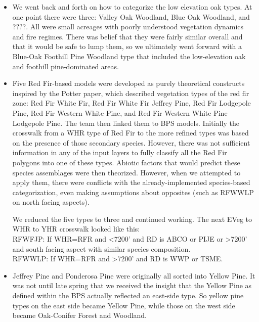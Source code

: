 \begin{itemize}
For example, here is the rule for how to derive YHR type PPBO from WHR:\\
``If \textgreater3000 feet in elevation  and the regional dominance is black oak or ponderosa pine then SMCX (S facing aspects) else SMCM (N facing aspects), else \textless3000 feet in elevation  and the regional dominance is black oak or ponderosa pine then PPBO.''

Note that this is an ecologically based theoretically model, but not one that is designed to be all inclusive and mutually exclusive within our vegetation cover framework.
\item We went back and forth on how to categorize the low elevation oak types. At one point there were three: Valley Oak Woodland, Blue Oak Woodland, and ????. All were small acreages with poorly understood vegetation dynamics and fire regimes. There was belief that they were fairly similar overall and that it would be safe to lump them, so we ultimately went forward with a Blue-Oak Foothill Pine Woodland type that included the low-elevation oak and foothill pine-dominated areas.

\item Five Red Fir-based models were developed as purely theoretical constructs inspired by the Potter paper, which described vegetation types of the red fir zone: Red Fir White Fir, Red Fir White Fir Jeffrey Pine, Red Fir Lodgepole Pine, Red Fir Western White Pine, and Red Fir Western White Pine Lodgepole Pine. The team then linked them to BPS models. Initially the crosswalk from a WHR type of Red Fir to the more refined types was based on the presence of those secondary species. However, there was not sufficient information in any of the input layers to fully classify all the Red Fir polygons into one of these types. Abiotic factors that would predict these species assemblages were then theorized. However, when we attempted to apply them, there were conflicts with the already-implemented species-based categorization, even making assumptions about opposites (such as RFWWLP on north facing aspects). 

We reduced the five types to three and continued working. The next EVeg to WHR to YHR crosswalk looked like this:\\
RFWFJP: If WHR=RFR and \textless7200' and RD is ABCO or PIJE  or \textgreater7200' and south facing aspect with similar species composition.\\
RFWWLP: If WHR=RFR and \textgreater7200' and RD is WWP or TSME.

\item Jeffrey Pine and Ponderosa Pine were originally all sorted into Yellow Pine. It was not until late spring that we received the insight that the Yellow Pine as defined within the BPS actually reflected an east-side type. So yellow pine types on the east side became Yellow Pine, while those on the west side became Oak-Conifer Forest and Woodland.


\end{itemize}
